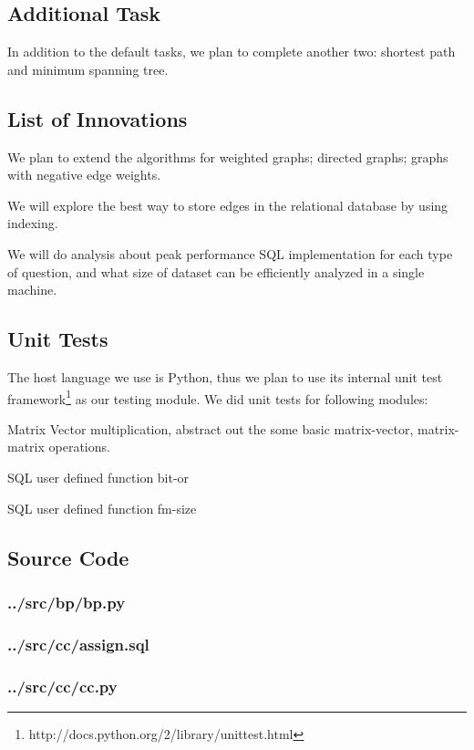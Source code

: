 \subsection{Additional Task}
In addition to the default tasks,  we plan to complete another two:  shortest path and minimum spanning tree. 

\subsection{List of Innovations}
\bit
\item We plan to extend the algorithms for weighted graphs; directed graphs; graphs with negative edge weights.
\item We will explore the best way to store edges in the relational database by using indexing.
\item We will do analysis about peak performance SQL implementation for each type of question, and what size of dataset can be efficiently analyzed in a single machine.
\eit

\subsection{Unit Tests}
The host language we use is Python, thus we plan to use its internal unit test framework\footnote{http://docs.python.org/2/library/unittest.html} as our testing module. We did unit tests for following modules:
\bit
\item Matrix Vector multiplication, abstract out the some basic matrix-vector, matrix-matrix operations. 
\item SQL user defined function bit-or
\item SQL user defined function fm-size
\eit

\newpage
\subsection{Source Code}
\subsubsection{../src/bp/bp.py}

\subsubsection{../src/cc/assign.sql}

\subsubsection{../src/cc/cc.py}

